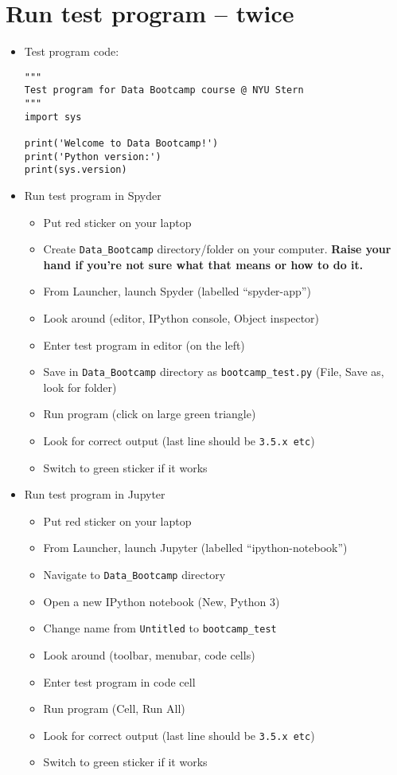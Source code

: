 \documentclass[11pt]{article}
\begin{document}
\section*{Run test program -- twice}

\begin{itemize}
\item Test program code:

\vspace{-0.1in}
\begin{verbatim}
"""
Test program for Data Bootcamp course @ NYU Stern
"""
import sys

print('Welcome to Data Bootcamp!')
print('Python version:')
print(sys.version)
\end{verbatim}

\item Run test program in Spyder
\begin{itemize}
\item Put red sticker on your laptop
\item Create \verb|Data_Bootcamp| directory/folder on your computer.
{\bf Raise your hand if you're not sure what that means or how to do it.}
\item From Launcher, launch Spyder (labelled ``spyder-app'')
\item Look around (editor, IPython console, Object inspector)
\item Enter test program in editor (on the left)
\item Save in \verb|Data_Bootcamp| directory as \verb|bootcamp_test.py|
(File, Save as, look for folder)
\item Run program (click on large green triangle)
\item Look for correct output (last line should be {\tt 3.5.x etc})
\item Switch to green sticker if it works
\end{itemize}

\item Run test program in Jupyter
\begin{itemize}
\item Put red sticker on your laptop
\item From Launcher, launch Jupyter (labelled ``ipython-notebook'')
\item Navigate to \verb|Data_Bootcamp| directory
\item Open a new IPython notebook (New, Python 3)
\item Change name from {\tt Untitled} to \verb|bootcamp_test|
\item Look around (toolbar, menubar, code cells)
\item Enter test program in code cell
\item Run program (Cell, Run All)
\item Look for correct output (last line should be {\tt 3.5.x etc})
\item Switch to green sticker if it works
\end{itemize}


\end{itemize}
\end{document}
